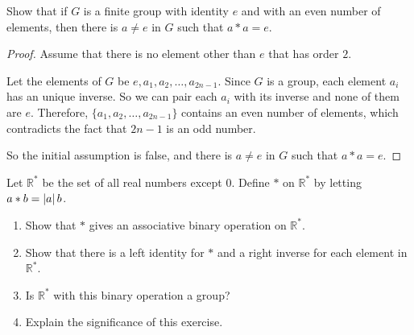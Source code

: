\begin{exercise}
    Show that if $G$ is a finite group with identity $e$ and with an even number of elements, then there is $a\ne e$ in $G$ such that $a * a = e$.
\end{exercise}

\begin{proof}
    Assume that there is no element other than $e$ that has order $2$.

    Let the elements of $G$ be $e, a_{1}, a_{2}, \ldots, a_{2n-1}$. Since $G$ is a group, each element $a_{i}$ has an unique inverse. So we can pair each $a_{i}$ with its inverse and none of them are $e$. Therefore, $\{ a_{1}, a_{2}, \ldots, a_{2n-1} \}$ contains an even number of elements, which contradicts the fact that $2n - 1$ is an odd number.

    So the initial assumption is false, and there is $a\ne e$ in $G$ such that $a * a = e$.
\end{proof}

\begin{exercise}
    Let $\mathbb{R}^{*}$ be the set of all real numbers except $0$. Define $*$ on $\mathbb{R}^{*}$ by letting $a * b = \left\vert{a}\right\vert b$.
    \begin{enumerate}[label={\textbf{\alph*.}}]
        \item Show that $*$ gives an associative binary operation on $\mathbb{R}^{*}$.
        \item Show that there is a left identity for $*$ and a right inverse for each element in $\mathbb{R}^{*}$.
        \item Is $\mathbb{R}^{*}$ with this binary operation a group?
        \item Explain the significance of this exercise.
    \end{enumerate}
\end{exercise}

